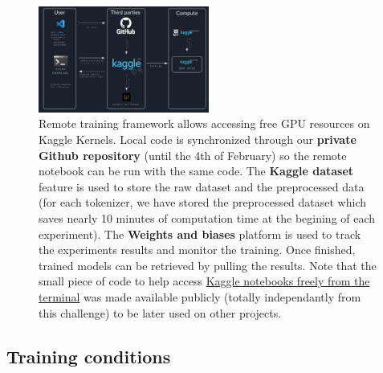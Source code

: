 \begin{figure}
    \centering
    \includegraphics[width=0.5\textwidth]{figures/training_framework.png}
    \caption{Remote training framework allows accessing free GPU resources on Kaggle Kernels. Local code is synchronized through our \textbf{private Github repository} (until the 4th of February) so the remote notebook can be run with the same code. The \textbf{Kaggle dataset} feature is used to store the raw dataset and the preprocessed data (for each tokenizer, we have stored the preprocessed dataset which saves nearly 10 minutes of computation time at the begining of each experiment). The \textbf{Weights and biases} platform is used to track the experiments results and monitor the training. Once finished, trained models can be retrieved by pulling the results.
    Note that the small piece of code to help access \href{https://github.com/balthazarneveu/mva\_pepites}{Kaggle notebooks freely from the terminal} was made available publicly (totally independantly from this challenge) to be later used on other projects.}
    \label{fig:framework}
\end{figure}

\subsection*{Training conditions}
\label{sec:training conditions}

